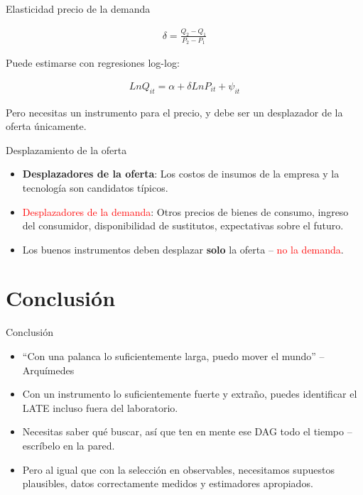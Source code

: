 \documentclass{beamer}
\begin{document}
\begin{frame}{Elasticidad precio de la demanda}

\begin{eqnarray*}
\delta = \frac{Q_2 - Q_1}{P_2 - P_1}
\end{eqnarray*}

\bigskip

Puede estimarse con regresiones log-log:

\bigskip

\begin{eqnarray*}
Ln Q_{it} = \alpha + \delta Ln P_{it} + \psi_{it}
\end{eqnarray*}

\bigskip

Pero necesitas un instrumento para el precio, y debe ser un desplazador de la oferta únicamente.

\end{frame}

\begin{frame}{Desplazamiento de la oferta}

\begin{itemize}
\item \textbf{Desplazadores de la oferta}: Los costos de insumos de la empresa y la tecnología son candidatos típicos.
\item \textcolor{red}{Desplazadores de la demanda}: Otros precios de bienes de consumo, ingreso del consumidor, disponibilidad de sustitutos, expectativas sobre el futuro.
\item Los buenos instrumentos deben desplazar \textbf{solo} la oferta -- \textcolor{red}{no la demanda}.
\end{itemize}

\end{frame}

\section{Conclusión}

\begin{frame}{Conclusión}

\begin{itemize}
\item ``Con una palanca lo suficientemente larga, puedo mover el mundo'' -- Arquímedes
\item Con un instrumento lo suficientemente fuerte y extraño, puedes identificar el LATE incluso fuera del laboratorio.
\item Necesitas saber qué buscar, así que ten en mente ese DAG todo el tiempo -- escríbelo en la pared.
\item Pero al igual que con la selección en observables, necesitamos supuestos plausibles, datos correctamente medidos y estimadores apropiados.
\end{itemize}

\end{frame}
\end{document}
